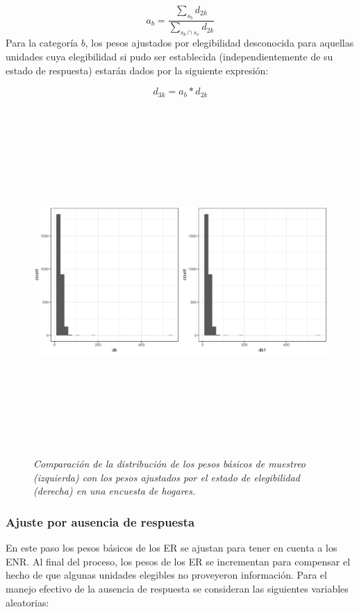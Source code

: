 \[
a_b = \frac{\sum_{s_b}d_{2k}}{\sum_{s_b \cap s_e}d_{2k}}
\]
Para la categoría \(b\), los pesos ajustados por elegibilidad desconocida para aquellas unidades cuya elegibilidad si pudo ser establecida (independientemente de su estado de respuesta) estarán dados por la siguiente expresión:

\[
d_{3k} = a_b * d_{2k}
\]

\begin{figure}
\centering
\includegraphics[width=\textwidth,height=5.20833in]{Pics/16.png}
\caption{\emph{Comparación de la distribución de los pesos básicos de muestreo (izquierda) con los pesos ajustados por el estado de elegibilidad (derecha) en una encuesta de hogares.}}
\end{figure}

\hypertarget{ajuste-por-ausencia-de-respuesta}{%
\subsubsection*{Ajuste por ausencia de respuesta}\label{ajuste-por-ausencia-de-respuesta}}


En este paso los pesos básicos de los ER se ajustan para tener en cuenta a los ENR. Al final del proceso, los pesos de los ER se incrementan para compensar el hecho de que algunas unidades elegibles no proveyeron información. Para el manejo efectivo de la ausencia de respuesta se consideran las siguientes variables aleatorias:

